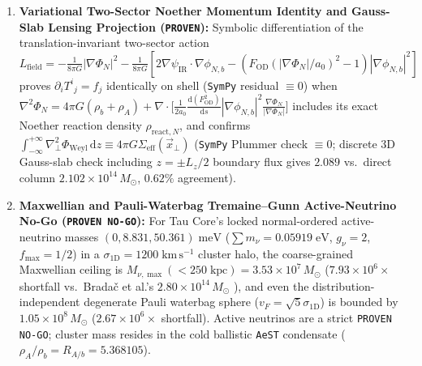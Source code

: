 \documentclass[11pt,a4paper]{article}
\begin{document}
\begin{enumerate}
    \item \textbf{Variational Two-Sector Noether Momentum Identity and Gauss-Slab Lensing Projection (\texttt{PROVEN}):} Symbolic differentiation of the translation-invariant two-sector action $L_{\mathrm{field}} = -\frac{1}{8\pi G}|\nabla\Phi_N|^2 - \frac{1}{8\pi G}[2\nabla\psi_{\mathrm{IR}}\cdot\nabla\phi_{N,b} - (F_{\mathrm{OD}}(|\nabla\Phi_N|/a_0)^2 - 1)|\nabla\phi_{N,b}|^2]$ proves $\partial_i T^i{}_j = f_j$ identically on shell (\texttt{SymPy} residual $\equiv 0$) when $\nabla^2\Phi_N = 4\pi G(\rho_b + \rho_A) + \nabla\cdot\bigl[\frac{1}{2a_0}\frac{\mathrm{d}(F_{\mathrm{OD}}^2)}{\mathrm{d}s}|\nabla\phi_{N,b}|^2\frac{\nabla\Phi_N}{|\nabla\Phi_N|}\bigr]$ includes its exact Noether reaction density $\rho_{\mathrm{react},N}$, and confirms $\int_{-\infty}^{+\infty}\nabla_\perp^2\Phi_{\mathrm{Weyl}}\,\mathrm{d}z \equiv 4\pi G\Sigma_{\mathrm{eff}}(\vec{x}_\perp)$ (\texttt{SymPy} Plummer check $\equiv 0$; discrete 3D Gauss-slab check including $z = \pm L_z/2$ boundary flux gives $2.089$ vs.\ direct column $2.102\times 10^{14}\,M_\odot$, $0.62\%$ agreement).
    \item \textbf{Maxwellian and Pauli-Waterbag Tremaine--Gunn Active-Neutrino No-Go (\texttt{PROVEN NO-GO}):} For Tau Core's locked normal-ordered active-neutrino masses $(0, 8.831, 50.361)\;\mathrm{meV}$ ($\sum m_\nu = 0.05919\;\mathrm{eV}$, $g_\nu = 2$, $f_{\max} = 1/2$) in a $\sigma_{1\mathrm{D}} = 1200\;\mathrm{km\,s^{-1}}$ cluster halo, the coarse-grained Maxwellian ceiling is $M_{\nu,\max}(<250\;\mathrm{kpc}) = 3.53\times 10^7\,M_\odot$ ($7.93\times 10^6\times$ shortfall vs.\ Brada\v{c} et al.'s $2.80\times 10^{14}\,M_\odot$ \cite{Bradac2006}), and even the distribution-independent degenerate Pauli waterbag sphere ($v_F = \sqrt{5}\sigma_{1\mathrm{D}}$) is bounded by $1.05\times 10^8\,M_\odot$ ($2.67\times 10^6\times$ shortfall). Active neutrinos are a strict \texttt{PROVEN NO-GO}; cluster mass resides in the cold ballistic \texttt{AeST} condensate ($\rho_A/\rho_b = R_{A/b} = 5.368105$).
\end{enumerate}
\end{document}
